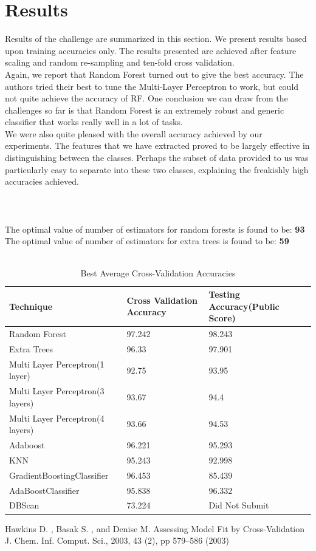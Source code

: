 \documentclass{llncs}
\begin{document}
\section{Results}
Results of the challenge are summarized in this section. We present results based upon training accuracies only. The results presented are achieved after feature scaling and random re-sampling and ten-fold cross validation. \\
Again, we report that Random Forest turned out to give the best accuracy. The authors tried their best to tune the Multi-Layer Perceptron to work, but could not quite achieve the accuracy of RF. One conclusion we can draw from the challenges so far is that Random Forest is an extremely robust and generic classifier that works really well in a lot of tasks. \\
We were also quite pleased with the overall accuracy achieved by our experiments. The features that we have extracted proved to be largely effective in distinguishing between the classes. Perhaps the subset of data provided to us was particularly easy to separate into these two classes, explaining the freakishly high accuracies achieved. \\\\\\\\
The optimal value of number of estimators for random forests is found to be: \textbf{93}\\
The optimal value of number of estimators for extra trees is found to be: \textbf{59}\\\\

\begin{table}[h]
	\centering
	\caption{Best Average Cross-Validation Accuracies}
	\begin{tabular}{ |p{5cm}||p{3cm}||p{3cm}|}
		\hline
		Technique                  &Cross Validation Accuracy & Testing Accuracy(Public Score)\\
		\hline
		Random Forest              								&97.242 &98.243\\
		Extra Trees													&96.33 & 97.901\\
		Multi Layer Perceptron(1 layer)	 			  		&92.75 &93.95\\
		Multi Layer Perceptron(3 layers)	 			  &93.67 &94.4\\
		Multi Layer Perceptron(4 layers)	 			  &93.66 &94.53\\
		Adaboost	 					            &96.221 &95.293\\
		KNN              				               &95.243 &92.998\\
		GradientBoostingClassifier	 						             &96.453 &85.439\\
		AdaBoostClassifier	 						             &95.838 &96.332\\
		DBScan	 						             &73.224 &Did Not Submit\\
		 \hline
	\end{tabular}
	\label{table}
\end{table}


%
%
\begin{thebibliography}{5}
%

Hawkins D. , Basak S. , and Denise M. 
Assessing Model Fit by Cross-Validation
J. Chem. Inf. Comput. Sci., 2003, 43 (2), pp 579–586 (2003)

\end{thebibliography}
\end{document}
